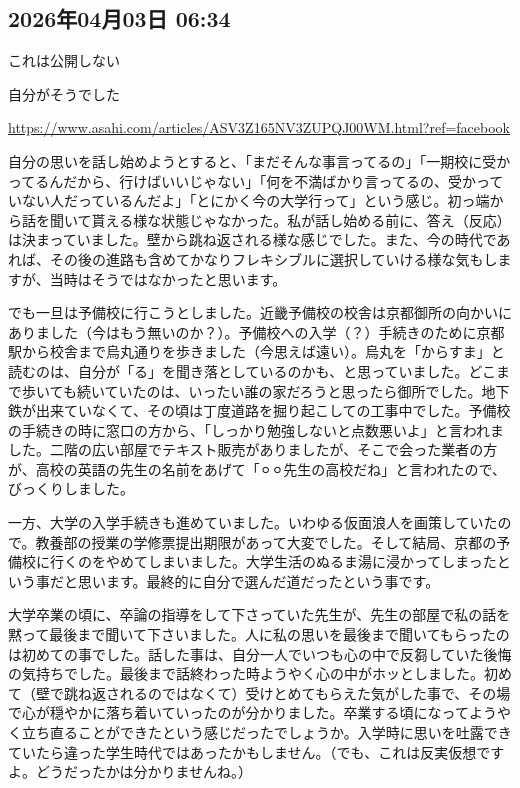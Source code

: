 \documentclass[facebook_diary.tex]{subfiles}
\begin{document}
\subsection*{2026年04月03日 06:34}

これは公開しない


自分がそうでした


\url{https://www.asahi.com/articles/ASV3Z165NV3ZUPQJ00WM.html?ref=facebook}




自分の思いを話し始めようとすると、「まだそんな事言ってるの」「一期校に受かってるんだから、行けばいいじゃない」「何を不満ばかり言ってるの、受かっていない人だっているんだよ」「とにかく今の大学行って」という感じ。初っ端から話を聞いて貰える様な状態じゃなかった。私が話し始める前に、答え（反応）は決まっていました。壁から跳ね返される様な感じでした。また、今の時代であれば、その後の進路も含めてかなりフレキシブルに選択していける様な気もしますが、当時はそうではなかったと思います。


でも一旦は予備校に行こうとしました。近畿予備校の校舎は京都御所の向かいにありました（今はもう無いのか？）。予備校への入学（？）手続きのために京都駅から校舎まで烏丸通りを歩きました（今思えば遠い）。烏丸を「からすま」と読むのは、自分が「る」を聞き落としているのかも、と思っていました。どこまで歩いても続いていたのは、いったい誰の家だろうと思ったら御所でした。地下鉄が出来ていなくて、その頃は丁度道路を掘り起こしての工事中でした。予備校の手続きの時に窓口の方から、「しっかり勉強しないと点数悪いよ」と言われました。二階の広い部屋でテキスト販売がありましたが、そこで会った業者の方が、高校の英語の先生の名前をあげて「⚪︎⚪︎先生の高校だね」と言われたので、びっくりしました。

一方、大学の入学手続きも進めていました。いわゆる仮面浪人を画策していたので。教養部の授業の学修票提出期限があって大変でした。そして結局、京都の予備校に行くのをやめてしまいました。大学生活のぬるま湯に浸かってしまったという事だと思います。最終的に自分で選んだ道だったという事です。


大学卒業の頃に、卒論の指導をして下さっていた先生が、先生の部屋で私の話を黙って最後まで聞いて下さいました。人に私の思いを最後まで聞いてもらったのは初めての事でした。話した事は、自分一人でいつも心の中で反芻していた後悔の気持ちでした。最後まで話終わった時ようやく心の中がホッとしました。初めて（壁で跳ね返されるのではなくて）受けとめてもらえた気がした事で、その場で心が穏やかに落ち着いていったのが分かりました。卒業する頃になってようやく立ち直ることができたという感じだったでしょうか。入学時に思いを吐露できていたら違った学生時代ではあったかもしません。（でも、これは反実仮想ですよ。どうだったかは分かりませんね。）
\end{document}

